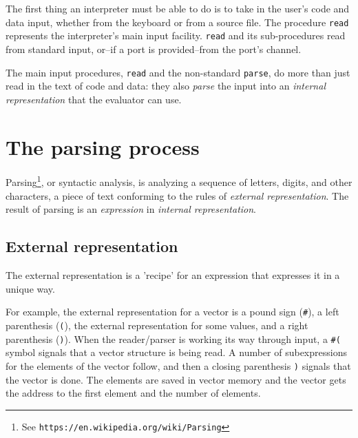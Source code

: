\documentclass[twoside]{report}
\begin{document}
The first thing an interpreter must be able to do is to take in the user's code and data input, whether from the keyboard or from a source file. The procedure \texttt{read} represents the interpreter's main input facility. \texttt{read} and its sub-procedures read from standard input, or--if a port is provided--from the port's channel.

The main input procedures, \texttt{read} and the non-standard \texttt{parse}, do more than just read in the text of code and data: they also \emph{parse} the input into an \emph{internal representation} that the evaluator can use.

\section{The parsing process}
\label{the-parsing-process}

Parsing\footnote{See \texttt{https://en.wikipedia.org/wiki/Parsing}}, or syntactic analysis, is analyzing a sequence of letters, digits, and other characters, a piece of text conforming to the rules of \emph{external representation}. The result of parsing is an \emph{expression} in \emph{internal representation}.

\subsection{External representation}
\label{external-representation}

The external representation is a 'recipe' for an expression that expresses it in a unique way.

For example, the external representation for a vector is a pound sign (\texttt{\#}), a left parenthesis (\texttt{(}), the external representation for some values, and a right parenthesis (\texttt{)}). When the reader/parser is working its way through input, a \texttt{\#(} symbol signals that a vector structure is being read. A number of subexpressions for the elements of the vector follow, and then a closing parenthesis \texttt{)} signals that the vector is done. The elements are saved in vector memory and the vector gets the address to the first element and the number of elements.
\end{document}
